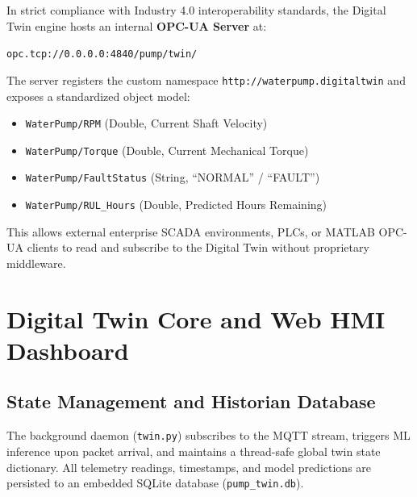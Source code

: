 \documentclass[11pt,a4paper]{article}
\begin{document}
In strict compliance with Industry 4.0 interoperability standards, the Digital Twin engine hosts an internal \textbf{OPC-UA Server} at:
\begin{center}
    \texttt{opc.tcp://0.0.0.0:4840/pump/twin/}
\end{center}
The server registers the custom namespace \texttt{http://waterpump.digitaltwin} and exposes a standardized object model:
\begin{itemize}
    \item \texttt{WaterPump/RPM} (Double, Current Shaft Velocity)
    \item \texttt{WaterPump/Torque} (Double, Current Mechanical Torque)
    \item \texttt{WaterPump/FaultStatus} (String, ``NORMAL'' / ``FAULT'')
    \item \texttt{WaterPump/RUL\_Hours} (Double, Predicted Hours Remaining)
\end{itemize}
This allows external enterprise SCADA environments, PLCs, or MATLAB OPC-UA clients to read and subscribe to the Digital Twin without proprietary middleware.

\section{Digital Twin Core and Web HMI Dashboard}

\subsection{State Management and Historian Database}
The background daemon (\texttt{twin.py}) subscribes to the MQTT stream, triggers ML inference upon packet arrival, and maintains a thread-safe global twin state dictionary. All telemetry readings, timestamps, and model predictions are persisted to an embedded SQLite database (\texttt{pump\_twin.db}).
\end{document}
